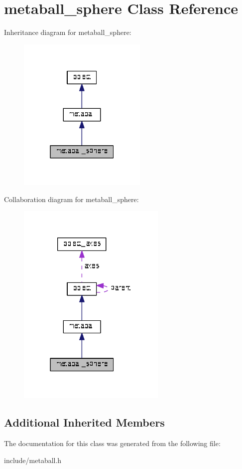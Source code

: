 \hypertarget{classmetaball__sphere}{}\section{metaball\+\_\+sphere Class Reference}
\label{classmetaball__sphere}


Inheritance diagram for metaball\+\_\+sphere\+:\nopagebreak
\begin{figure}[H]
\begin{center}
\leavevmode
\includegraphics[width=175pt]{classmetaball__sphere__inherit__graph}
\end{center}
\end{figure}


Collaboration diagram for metaball\+\_\+sphere\+:\nopagebreak
\begin{figure}[H]
\begin{center}
\leavevmode
\includegraphics[width=202pt]{classmetaball__sphere__coll__graph}
\end{center}
\end{figure}
\subsection*{Additional Inherited Members}


The documentation for this class was generated from the following file\+:\begin{DoxyCompactItemize}
\item 
include/metaball.\+h\end{DoxyCompactItemize}
